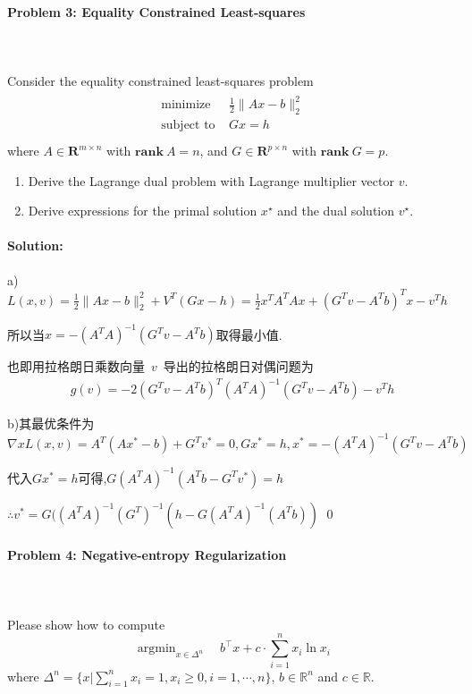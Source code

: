\documentclass[a4paper]{ctexart}
\DeclareMathOperator*{\argmin}{argmin}
\newenvironment{solution}
{\color{blue} \paragraph{Solution:\\}}
{\newline \qed}
\begin{document}
\paragraph{Problem 3: Equality Constrained Least-squares}
~\\
~\\
Consider the equality constrained least-squares problem
\begin{gather*}
    \begin{matrix}
        \text{minimize~~} & \frac{1}{2}\|Ax-b\|_2^2 \\
        \text{subject to} & Gx=h~~                  \\
    \end{matrix}
\end{gather*}
where $A\in\mathbf{R}^{m\times n}$ with $\mathbf{rank}~A=n$, and $G\in\mathbf{R}^{p\times n}$ with $\mathbf{rank}~G=p$.
\begin{enumerate}[(1)]
    \item Derive the Lagrange dual problem with Lagrange multiplier vector $v$.
    \item Derive expressions for the primal solution $x^\star$ and the dual solution $v^\star$.
\end{enumerate}

\begin{solution}
    a)$L(x,v)=\frac{1}{2} \|Ax-b\|_2^2+V^T(Gx-h)=\frac{1}{2} x^TA^TAx+(G^Tv-A^Tb)^Tx-v^Th$

    所以当$x=-(A^TA)^{-1}(G^Tv-A^Tb)$取得最小值.

    也即用拉格朗日乘数向量~$v$~导出的拉格朗日对偶问题为
    \begin{align*}
        g(v)=-2(G^Tv-A^Tb)^T(A^TA)^{-1}(G^Tv-A^Tb)-v^Th
    \end{align*}

    b)其最优条件为$\nabla xL(x,v)=A^T(Ax^*-b)+G^Tv^*=0,Gx^*=h,x^*=-(A^TA)^{-1}(G^Tv-A^Tb)$

    代入$Gx^*=h$可得,$G(A^TA)^{-1}(A^Tb-G^Tv^*)=h$

    $\therefore v^*=G((A^TA)^{-1}(G^T)^{-1}(h-G(A^TA)^{-1}(A^Tb))$
\end{solution}

\paragraph{Problem 4: Negative-entropy Regularization}
~\\
~\\
Please show how to compute
\begin{equation*}
    \argmin_{x\in \Delta^n} \quad b^\top x+c\cdot\sum_{i=1}^n x_i\ln x_i
\end{equation*}
where $\Delta^n=\{x|\sum_{i=1}^n x_i=1,x_i\geq0,i=1,\cdots,n\}$, $b\in\mathbb{R}^n$ and $c\in\mathbb{R}$.
\end{document}

